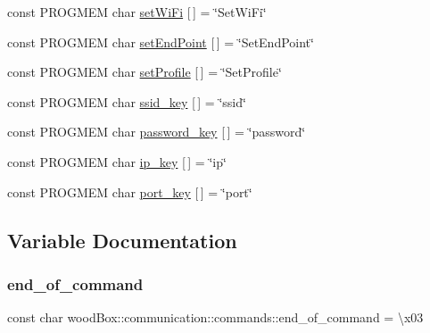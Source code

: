 \begin{DoxyCompactItemize}
\item 
const P\+R\+O\+G\+M\+EM char \mbox{\hyperlink{namespacewood_box_1_1communication_1_1commands_ab45ac37d499fb4c9a6381e77032a4d9e}{set\+Wi\+Fi}} \mbox{[}$\,$\mbox{]} = \char`\"{}Set\+Wi\+Fi\char`\"{}
\item 
const P\+R\+O\+G\+M\+EM char \mbox{\hyperlink{namespacewood_box_1_1communication_1_1commands_a458319952946bba3318825dbfcc8d55f}{set\+End\+Point}} \mbox{[}$\,$\mbox{]} = \char`\"{}Set\+End\+Point\char`\"{}
\item 
const P\+R\+O\+G\+M\+EM char \mbox{\hyperlink{namespacewood_box_1_1communication_1_1commands_a4d4ed99696ad571a3587986507c580b1}{set\+Profile}} \mbox{[}$\,$\mbox{]} = \char`\"{}Set\+Profile\char`\"{}
\item 
const P\+R\+O\+G\+M\+EM char \mbox{\hyperlink{namespacewood_box_1_1communication_1_1commands_abca078c40f57a86aad8e4deefbada4f8}{ssid\+\_\+key}} \mbox{[}$\,$\mbox{]} = \char`\"{}ssid\char`\"{}
\item 
const P\+R\+O\+G\+M\+EM char \mbox{\hyperlink{namespacewood_box_1_1communication_1_1commands_abc4cc92f05eab336200680b50b35630c}{password\+\_\+key}} \mbox{[}$\,$\mbox{]} = \char`\"{}password\char`\"{}
\item 
const P\+R\+O\+G\+M\+EM char \mbox{\hyperlink{namespacewood_box_1_1communication_1_1commands_aae0ce9ea6660f4d4d6f24b69e27e62cd}{ip\+\_\+key}} \mbox{[}$\,$\mbox{]} = \char`\"{}ip\char`\"{}
\item 
const P\+R\+O\+G\+M\+EM char \mbox{\hyperlink{namespacewood_box_1_1communication_1_1commands_af51ee90b8346b7778b6162cab4dad46d}{port\+\_\+key}} \mbox{[}$\,$\mbox{]} = \char`\"{}port\char`\"{}
\end{DoxyCompactItemize}


\subsection{Variable Documentation}
\mbox{\label{namespacewood_box_1_1communication_1_1commands_ac8f4a3315508756fb53544d3178d55c4}} 
\subsubsection{\texorpdfstring{end\+\_\+of\+\_\+command}{end\_of\_command}}
{\footnotesize\ttfamily const char wood\+Box\+::communication\+::commands\+::end\+\_\+of\+\_\+command = \textquotesingle{}\textbackslash{}x03\textquotesingle{}}



